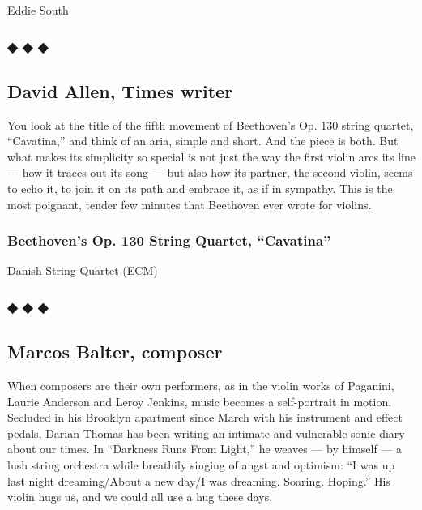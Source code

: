 Eddie South

\hypertarget{---3}{%
\subsubsection{◆ ◆ ◆}\label{---3}}

\hypertarget{david-allen-times-writer}{%
\subsection{David Allen, Times writer}\label{david-allen-times-writer}}

You look at the title of the fifth movement of Beethoven's Op. 130
string quartet, ``Cavatina,'' and think of an aria, simple and short.
And the piece is both. But what makes its simplicity so special is not
just the way the first violin arcs its line --- how it traces out its
song --- but also how its partner, the second violin, seems to echo it,
to join it on its path and embrace it, as if in sympathy. This is the
most poignant, tender few minutes that Beethoven ever wrote for violins.

\hypertarget{beethovens-op-130-string-quartet-cavatina}{%
\subsubsection{Beethoven's Op. 130 String Quartet,
``Cavatina''}\label{beethovens-op-130-string-quartet-cavatina}}

Danish String Quartet (ECM)

\hypertarget{---4}{%
\subsubsection{◆ ◆ ◆}\label{---4}}

\hypertarget{marcos-balter-composer}{%
\subsection{Marcos Balter, composer}\label{marcos-balter-composer}}

When composers are their own performers, as in the violin works of
Paganini, Laurie Anderson and Leroy Jenkins, music becomes a
self-portrait in motion. Secluded in his Brooklyn apartment since March
with his instrument and effect pedals, Darian Thomas has been writing an
intimate and vulnerable sonic diary about our times. In ``Darkness Runs
From Light,'' he weaves --- by himself --- a lush string orchestra while
breathily singing of angst and optimism: ``I was up last night
dreaming/About a new day/I was dreaming. Soaring. Hoping.'' His violin
hugs us, and we could all use a hug these days.

